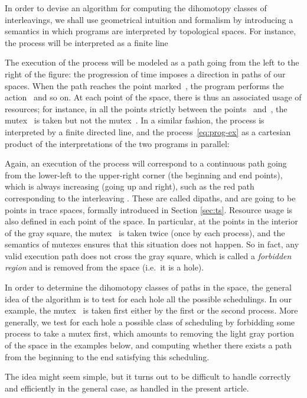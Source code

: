 \documentclass[orivec]{llncs} \usepackage[T1]{fontenc}
\newcommand{\ie}{i.e.~}
\begin{document}
{In order to devise an algorithm for computing the dihomotopy classes of
interleavings, we shall use geometrical intuition and formalism by introducing a
semantics in which programs are interpreted by topological spaces. For instance,
the process  will be interpreted as a finite line

The execution of the process will be modeled as a path going from the left to
the right of the figure: the progression of time imposes a direction in paths of
our spaces. When the path reaches the point marked~, the program performs
the action~ and so on. At each point of the space, there is thus an
associated usage of resources; for instance, in all the points strictly between
the points~ and~, the mutex~ is taken but not the mutex~. In a
similar fashion, the process  is interpreted by a finite directed
line, and the process~\eqref{eq:prog-ex} as a cartesian product of the
interpretations of the two programs in parallel:

Again, an execution of the process will correspond to a continuous path going
from the lower-left to the upper-right corner (the beginning and end points),
which is always increasing (going up and right), such as the red path
corresponding to the interleaving . These are
called dipaths, and are going to be points in trace spaces, formally introduced
in Section \ref{sec:ts}.  Resource usage is also defined in each point of the
space. In particular, at the points in the interior of the gray square, the
mutex~ is taken twice (once by each process), and the semantics of mutexes
ensures that this situation does not happen. So in fact, any valid execution
path does not cross the gray square, which is called a \emph{forbidden region}
and is removed from the space (\ie it is a hole).

In order to determine the dihomotopy classes of paths in the space, the general
idea of the algorithm is to test for each hole all the possible schedulings. In
our example, the mutex~ is taken first either by the first or the second
process. More generally, we test for each hole a possible class of scheduling by
forbidding some process to take a mutex first, which amounts to removing the light
gray portion of the space in the examples below, and computing whether there
exists a path from the beginning to the end satisfying this scheduling.

The idea might seem simple, but it turns out to be difficult to handle correctly
and efficiently in the general case, as handled in the present
article.


}
\end{document}
